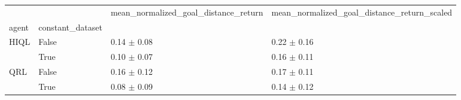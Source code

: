 \begin{tabular}{llll}
\toprule
 &  & mean_normalized_goal_distance_return & mean_normalized_goal_distance_return_scaled \\
agent & constant_dataset &  &  \\
\midrule
\multirow[t]{2}{*}{HIQL} & False & 0.14 $\pm$ 0.08 & 0.22 $\pm$ 0.16 \\
 & True & 0.10 $\pm$ 0.07 & 0.16 $\pm$ 0.11 \\
\cline{1-4}
\multirow[t]{2}{*}{QRL} & False & 0.16 $\pm$ 0.12 & 0.17 $\pm$ 0.11 \\
 & True & 0.08 $\pm$ 0.09 & 0.14 $\pm$ 0.12 \\
\cline{1-4}
\bottomrule
\end{tabular}
